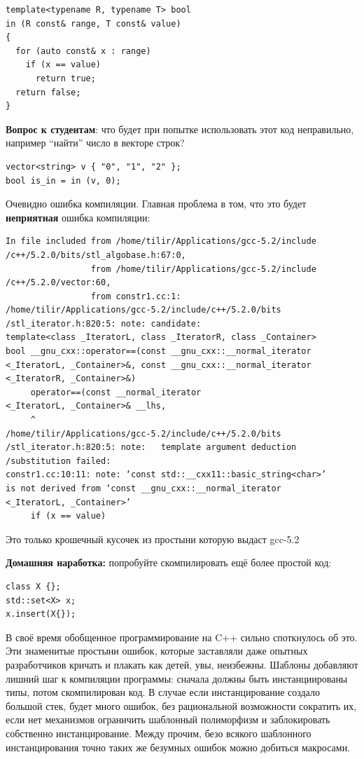 \documentclass[a4paper,12pt,oneside]{article}
\newif\ifanswers
\begin{document}
\begin{lstlisting}
template<typename R, typename T> bool 
in (R const& range, T const& value) 
{
  for (auto const& x : range)
    if (x == value)
      return true;
  return false;
}
\end{lstlisting}

\textbf{Вопрос к студентам}: что будет при попытке использовать этот код неправильно, например ``найти'' число в векторе строк?

\begin{lstlisting}
vector<string> v { "0", "1", "2" };
bool is_in = in (v, 0);
\end{lstlisting}

Очевидно ошибка компиляции. Главная проблема в том, что это будет \textbf{неприятная} ошибка компиляции:

\begin{verbatim}
In file included from /home/tilir/Applications/gcc-5.2/include
/c++/5.2.0/bits/stl_algobase.h:67:0,
                 from /home/tilir/Applications/gcc-5.2/include
/c++/5.2.0/vector:60,
                 from constr1.cc:1:
/home/tilir/Applications/gcc-5.2/include/c++/5.2.0/bits
/stl_iterator.h:820:5: note: candidate: 
template<class _IteratorL, class _IteratorR, class _Container> 
bool __gnu_cxx::operator==(const __gnu_cxx::__normal_iterator
<_IteratorL, _Container>&, const __gnu_cxx::__normal_iterator
<_IteratorR, _Container>&)
     operator==(const __normal_iterator
<_IteratorL, _Container>& __lhs,
     ^
/home/tilir/Applications/gcc-5.2/include/c++/5.2.0/bits
/stl_iterator.h:820:5: note:   template argument deduction
/substitution failed:
constr1.cc:10:11: note: ‘const std::__cxx11::basic_string<char>’ 
is not derived from ‘const __gnu_cxx::__normal_iterator
<_IteratorL, _Container>’
     if (x == value)
\end{verbatim}

Это только крошечный кусочек из простыни которую выдаст gcc-5.2

\textbf{Домашняя наработка:} попробуйте скомпилировать ещё более простой код:

\begin{lstlisting}
class X {};
std::set<X> x;
x.insert(X{});
\end{lstlisting}

В своё время обобщенное программирование на C++ сильно споткнулось об это. Эти знаменитые простыни ошибок, которые заставляли даже опытных разработчиков кричать и плакать как детей, увы, неизбежны. Шаблоны добавляют лишний шаг к компиляции программы: сначала должны быть инстанциированы типы, потом скомпилирован код. В случае если инстанцирование создало большой стек, будет много ошибок, без рациональной возможности сократить их, если нет механизмов ограничить шаблонный полиморфизм и заблокировать собственно инстанцирование. Между прочим, безо всякого шаблонного инстанцирования точно таких же безумных ошибок можно добиться макросами.
\end{document}
